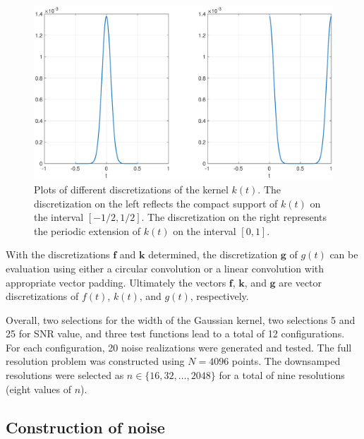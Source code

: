 \documentclass[12pt]{article}
\newcommand{\gVec}{\mathbf{g}}	%
\newcommand{\kVec}{\mathbf{k}}	%
\newcommand{\fVec}{\mathbf{f}}	%
\begin{document}
\begin{figure}
	\centerline{\includegraphics[scale = 0.45]{Figures/RegAndTroughGaussian.eps}}
\caption{Plots of different discretizations of the kernel $k(t)$. The discretization on the left reflects the compact support of $k(t)$ on the interval $[-1/2,1/2]$. The discretization on the right represents the periodic extension of $k(t)$ on the interval $[0,1]$.}
\label{RegAndTroughGaussian}
\end{figure}

With the discretizations $\fVec$ and $\kVec$ determined, the discretization $\gVec$ of $g(t)$ can be evaluation using either a circular convolution or a linear convolution with appropriate vector padding. Ultimately the vectors $\fVec$, $\kVec$, and $\gVec$ are vector discretizations of $f(t)$, $k(t)$, and $g(t)$, respectively. \par
Overall, two selections for the width of the Gaussian kernel, two selections 5 and 25 for SNR value, and three test functions lead to a total of 12 configurations. For each configuration, 20 noise realizations were generated and tested. The full resolution problem was constructed using $N = 4096$ points. The downsamped resolutions were selected as $n \in \{16,32,\ldots,2048\}$ for a total of nine resolutions (eight values of $n$).

\subsection{Construction of noise} \label{sec:Construction of noise}
\end{document}
